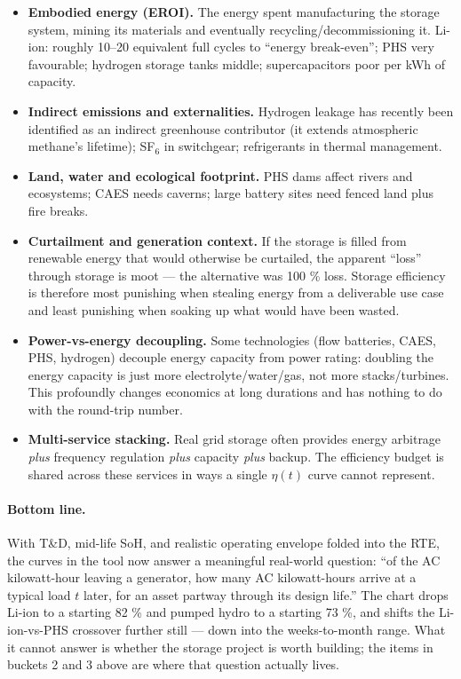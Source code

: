\begin{itemize}
    \item \textbf{Embodied energy (EROI).} The energy spent
    manufacturing the storage system, mining its materials and
    eventually recycling/decommissioning it. Li-ion: roughly 10--20
    equivalent full cycles to ``energy break-even''; PHS very
    favourable; hydrogen storage tanks middle; supercapacitors
    poor per kWh of capacity.
    \item \textbf{Indirect emissions and externalities.}
    Hydrogen leakage has recently been identified as an indirect
    greenhouse contributor (it extends atmospheric methane's
    lifetime); SF$_6$ in switchgear; refrigerants in thermal
    management.
    \item \textbf{Land, water and ecological footprint.} PHS dams
    affect rivers and ecosystems; CAES needs caverns; large battery
    sites need fenced land plus fire breaks.
    \item \textbf{Curtailment and generation context.} If the
    storage is filled from renewable energy that would otherwise
    be curtailed, the apparent ``loss'' through storage is moot ---
    the alternative was 100 \% loss. Storage efficiency is therefore
    most punishing when stealing energy from a deliverable use case
    and least punishing when soaking up what would have been wasted.
    \item \textbf{Power-vs-energy decoupling.} Some technologies
    (flow batteries, CAES, PHS, hydrogen) decouple energy capacity
    from power rating: doubling the energy capacity is just more
    electrolyte/water/gas, not more stacks/turbines. This
    profoundly changes economics at long durations and has nothing
    to do with the round-trip number.
    \item \textbf{Multi-service stacking.} Real grid storage often
    provides energy arbitrage \emph{plus} frequency regulation
    \emph{plus} capacity \emph{plus} backup. The efficiency budget
    is shared across these services in ways a single $\eta(t)$
    curve cannot represent.
\end{itemize}

\paragraph{Bottom line.}
With T\&D, mid-life SoH, and realistic operating envelope folded
into the RTE, the curves in the tool now answer a meaningful
real-world question: ``of the AC kilowatt-hour leaving a generator,
how many AC kilowatt-hours arrive at a typical load $t$ later, for
an asset partway through its design life.'' The chart drops Li-ion
to a starting 82 \% and pumped hydro to a starting 73 \%, and shifts
the Li-ion-vs-PHS crossover further still --- down into the
weeks-to-month range. What it cannot answer is whether the storage
project is worth building; the items in buckets 2 and 3 above are
where that question actually lives.

